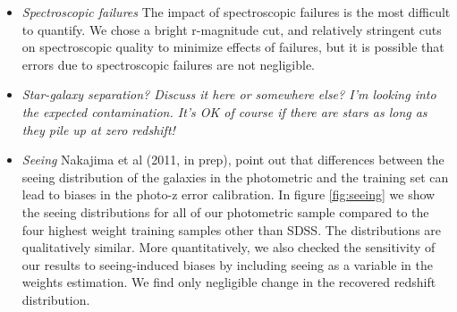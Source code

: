 \documentclass[preprint]{aastex}
\begin{document}
\begin{itemize}
\item {\it Spectroscopic failures} The impact of spectroscopic failures is the
most difficult to quantify.  We chose a bright r-magnitude cut, and relatively
stringent cuts on spectroscopic quality to minimize effects of failures, but it
is possible that errors due to spectroscopic failures are not negligible.

\item {\it Star-galaxy separation? Discuss it here or somewhere else? {\color{red} I'm
looking into the expected contamination.  It's OK of course if there are stars as long as they
pile up at zero redshift!}}

\item {\it Seeing} Nakajima et al (2011, in prep), point out that differences
between the seeing distribution of the galaxies in the photometric and the
training set can lead to biases in the photo-z error calibration.  In figure
\ref{fig:seeing} we show the seeing distributions for all of our photometric
sample compared to the four highest weight training samples other than SDSS.
The distributions are qualitatively similar.  More quantitatively, we also
checked the sensitivity of our results to seeing-induced biases by including
seeing as a variable in the weights estimation.  We find only negligible change
in the recovered redshift distribution. 

\end{itemize}
\end{document}
